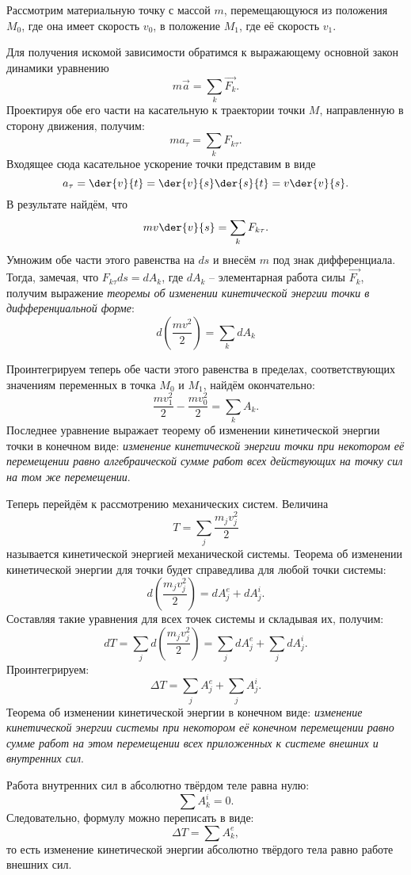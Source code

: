 

Рассмотрим материальную точку с массой \( m \), перемещающуюся из положения
\( M_0 \), где она имеет скорость \( v_0 \), в положение \( M_1 \), где её
скорость \( v_1 \).

Для получения искомой зависимости обратимся к выражающему основной закон
динамики уравнению
\[
	m\vec{a} = \sum_k \vec{F_k}.
\]
Проектируя обе его части на касательную к траектории точки \( M \),
направленную в сторону движения, получим:
\[
    ma_\tau = \sum_k F_{k\tau}.
\]
Входящее сюда касательное ускорение точки представим в виде
\[
    a_\tau = \der{v}{t} = \der{v}{s}\der{s}{t} = v\der{v}{s}.
\]
В результате найдём, что
\[
    mv\der{v}{s} = \sum_k F_{k\tau}.
\]
Умножим обе части этого равенства на \( ds \) и внесём \( m \) под знак 
дифференциала. Тогда, замечая, что \( F_{k\tau}ds = dA_k \), где 
\( dA_k \) -- элементарная работа силы \( \vec{F_k} \), получим выражение 
\emph{теоремы об изменении кинетической энергии точки в дифференциальной 
форме}:
\[
    d\left( \frac{mv^2}{2} \right) = \sum_k dA_k
\]

Проинтегрируем теперь обе части этого равенства в пределах, соответствующих 
значениям переменных в точка \( M_0 \) и \( M_1 \), найдём окончательно:
\[
    \frac{mv^2_1}{2} - \frac{mv^2_0}{2} = \sum_k A_k.
\]
Последнее уравнение выражает теорему об изменении кинетической 
энергии точки в конечном виде: \emph{изменение кинетической энергии точки при 
некотором её перемещении равно алгебраической сумме работ всех действующих 
на точку сил на том же перемещении}.

Теперь перейдём к рассмотрению механических систем. Величина
\[
	T = \sum_j \frac{m_jv_j^2}{2}
\]
называется кинетической энергией механической системы. Теорема об изменении
кинетической энергии для точки будет справедлива для любой точки системы:
\[
    d\left(\frac{m_j v_j^2}{2}\right) = dA^e_j + dA^i_j.
\]
Составляя такие уравнения для всех точек системы и складывая их, получим:
\[
    dT = \sum_j d\left(\frac{m_jv_j^2}{2}\right) =
    \sum_j dA^e_j + \sum_j dA^i_j.
\]
Проинтегрируем:
\[ 
	\Delta T = \sum_j A^e_j + \sum_j A^i_j.
\]
Теорема об изменении кинетической энергии в конечном виде: 
\emph{изменение кинетической энергии системы при некотором её 
конечном перемещении равно сумме работ на этом перемещении всех 
приложенных к системе внешних и внутренних сил}.

Работа внутренних сил в абсолютно твёрдом теле равна нулю:
\[
	\sum A^i_k = 0.
\]
Следовательно, формулу можно переписать в виде:
\[
    \Delta T = \sum A^e_k,
\] 
то есть изменение кинетической энергии абсолютно твёрдого тела равно работе внешних сил.
\newpage
